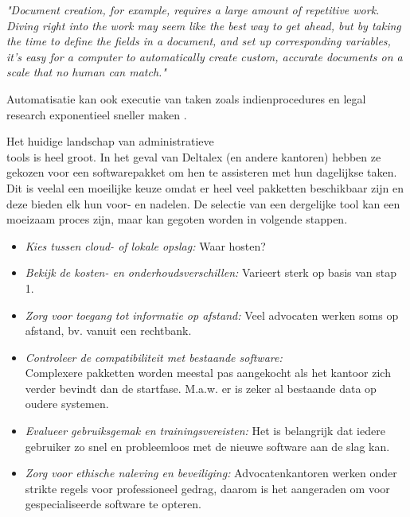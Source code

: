 \begin{displayquote}
    \textit{"Document creation, for example, requires a large amount of repetitive work. Diving right into the work may seem like the best way to get ahead, but by taking the time to define the fields in a document, and set up corresponding variables, it’s easy for a computer to automatically create custom, accurate documents on a scale that no human can match."}
\autocite{ThomsonReuters2023}
\end{displayquote}


Automatisatie kan ook executie van taken zoals indienprocedures en legal research exponentieel sneller maken \autocite{Aston2023}.

Het huidige landschap van administratieve\\ tools is heel groot. In het geval van Deltalex (en andere kantoren) hebben ze gekozen voor een softwarepakket om hen te assisteren met hun dagelijkse taken. Dit is veelal een moeilijke keuze omdat er heel veel pakketten beschikbaar zijn en deze bieden elk hun voor- en nadelen. De selectie van een dergelijke tool kan een moeizaam proces zijn, maar kan gegoten worden in volgende stappen.
\autocite{Clio2023}

\begin{itemize}
	\item \emph{Kies tussen cloud- of lokale opslag:} Waar hosten? 
        \item \emph{Bekijk de kosten- en onderhoudsverschillen:} Varieert sterk op basis van stap 1.
        \item \emph{Zorg voor toegang tot informatie op afstand:} Veel advocaten werken soms op afstand, bv. vanuit een rechtbank.
        \item \emph{Controleer de compatibiliteit met bestaande software:}\\ Complexere pakketten worden meestal pas aangekocht als het kantoor zich verder bevindt dan de startfase. M.a.w. er is zeker al bestaande data op oudere systemen.
        \item \emph{Evalueer gebruiksgemak en trainingsvereisten:} Het is belangrijk dat iedere gebruiker zo snel en probleemloos met de nieuwe software aan de slag kan.
        \item \emph{Zorg voor ethische naleving en beveiliging:} Advocatenkantoren werken onder strikte regels voor professioneel gedrag, daarom is het aangeraden om voor gespecialiseerde software te opteren.
\end{itemize}

